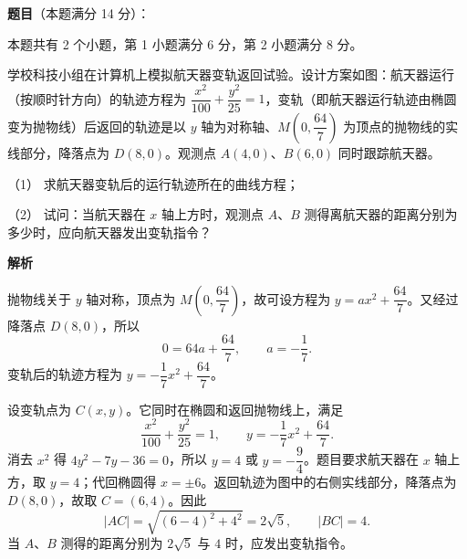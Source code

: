 \begin{answer}

\textbf{题目}（本题满分 14 分）：

本题共有 2 个小题，第 1 小题满分 6 分，第 2 小题满分 8 分。

学校科技小组在计算机上模拟航天器变轨返回试验。设计方案如图：航天器运行（按顺时针方向）的轨迹方程为 $\dfrac{x^2}{100}+\dfrac{y^2}{25}=1$，变轨（即航天器运行轨迹由椭圆变为抛物线）后返回的轨迹是以 $y$ 轴为对称轴、$M\left(0,\dfrac{64}{7}\right)$ 为顶点的抛物线的实线部分，降落点为 $D(8,0)$。观测点 $A(4,0)\text{、}B(6,0)$ 同时跟踪航天器。
\nopagebreak[4]
\begin{center}\end{center}
\nopagebreak[4]
（1） 求航天器变轨后的运行轨迹所在的曲线方程；

（2） 试问：当航天器在 $x$ 轴上方时，观测点 $A\text{、}B$ 测得离航天器的距离分别为多少时，应向航天器发出变轨指令？

\textbf{解析}


抛物线关于 $y$ 轴对称，顶点为 $M(0,\dfrac{64}{7})$，故可设方程为 $y=ax^2+\dfrac{64}{7}$。又经过降落点 $D(8,0)$，所以
\nopagebreak[4]
\[
0=64a+\frac{64}{7},\qquad a=-\frac17.
\]
变轨后的轨迹方程为 $y=-\dfrac17x^2+\dfrac{64}{7}$。


设变轨点为 $C(x,y)$。它同时在椭圆和返回抛物线上，满足
\nopagebreak[4]
\[
\frac{x^2}{100}+\frac{y^2}{25}=1,\qquad y=-\frac17x^2+\frac{64}{7}.
\]
消去 $x^2$ 得 $4y^2-7y-36=0$，所以 $y=4$ 或 $y=-\dfrac94$。题目要求航天器在 $x$ 轴上方，取 $y=4$；代回椭圆得 $x=\pm6$。返回轨迹为图中的右侧实线部分，降落点为 $D(8,0)$，故取 $C=(6,4)$。因此
\nopagebreak[4]
\[
|AC|=\sqrt{(6-4)^2+4^2}=2\sqrt5,\qquad |BC|=4.
\]
当 $A\text{、}B$ 测得的距离分别为 $2\sqrt5$ 与 $4$ 时，应发出变轨指令。



\end{answer}
